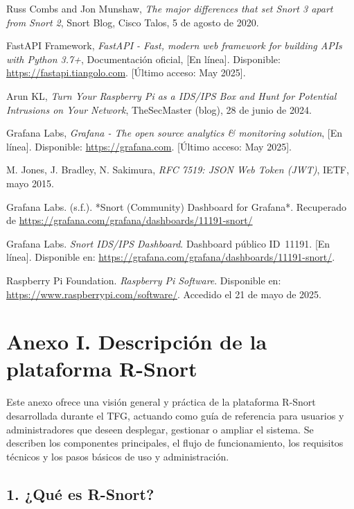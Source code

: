 \documentclass[11pt,a4paper,twoside]{report}
\begin{document}
\begin{thebibliography}{99}
	 Russ Combs and Jon Munshaw, \emph{The major differences that set Snort 3 apart from Snort 2}, Snort Blog, Cisco Talos, 5 de agosto de 2020.
	
	 FastAPI Framework, \emph{FastAPI - Fast, modern web framework for building APIs with Python 3.7+}, Documentación oficial, [En línea]. Disponible: \url{https://fastapi.tiangolo.com}. [Último acceso: May 2025].
	
	 Arun KL, \emph{Turn Your Raspberry Pi as a IDS/IPS Box and Hunt for Potential Intrusions on Your Network}, TheSecMaster (blog), 28 de junio de 2024.
	
	 Grafana Labs, \emph{Grafana - The open source analytics \& monitoring solution}, [En línea]. Disponible: \url{https://grafana.com}. [Último acceso: May 2025].
	
	 M. Jones, J. Bradley, N. Sakimura, \emph{RFC 7519: JSON Web Token (JWT)}, IETF, mayo 2015.
	
	Grafana Labs. (s.f.). *Snort (Community) Dashboard for Grafana*. Recuperado de \url{https://grafana.com/grafana/dashboards/11191-snort/}
	
	 Grafana Labs. \emph{Snort IDS/IPS Dashboard}. Dashboard público ID~11191. [En línea]. Disponible en: \url{https://grafana.com/grafana/dashboards/11191-snort/}.
	
	Raspberry Pi Foundation. \textit{Raspberry Pi Software}. Disponible en: \url{https://www.raspberrypi.com/software/}. Accedido el 21 de mayo de 2025.
	
\end{thebibliography}

\appendix
\chapter*{Anexo I. Descripción de la plataforma R-Snort}

Este anexo ofrece una visión general y práctica de la plataforma R-Snort desarrollada durante el TFG, actuando como guía de referencia para usuarios y administradores que deseen desplegar, gestionar o ampliar el sistema. Se describen los componentes principales, el flujo de funcionamiento, los requisitos técnicos y los pasos básicos de uso y administración.

\section*{1. ¿Qué es R-Snort?}
\end{document}

